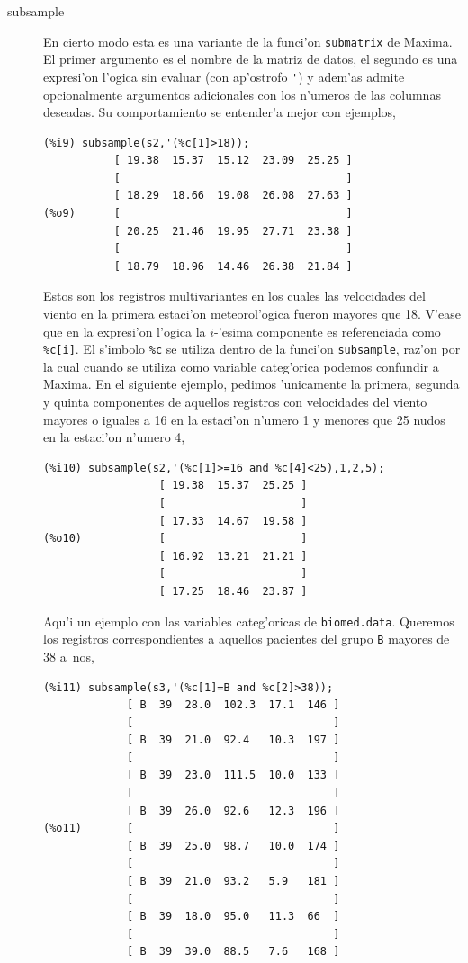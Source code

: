 \documentclass[spanish,12pt,a4paper]{article}
\begin{document}
\begin{description}
\item[subsample] En cierto modo esta es una variante de la funci'on \verb|submatrix| de Maxima. El primer argumento es el nombre de la matriz de datos, el segundo es una expresi'on l'ogica sin evaluar (con ap'ostrofo \verb|'|) y adem'as admite opcionalmente argumentos adicionales con los n'umeros de las columnas deseadas. Su comportamiento se entender'a mejor con ejemplos,
\begin{verbatim}
(%i9) subsample(s2,'(%c[1]>18));
           [ 19.38  15.37  15.12  23.09  25.25 ]
           [                                   ]
           [ 18.29  18.66  19.08  26.08  27.63 ]
(%o9)      [                                   ]
           [ 20.25  21.46  19.95  27.71  23.38 ]
           [                                   ]
           [ 18.79  18.96  14.46  26.38  21.84 ]
\end{verbatim}
Estos son los registros multivariantes en los cuales las velocidades del viento en la primera estaci'on meteorol'ogica fueron mayores que 18. V'ease que en la expresi'on l'ogica la $i$-'esima componente es referenciada como \verb|%c[i]|. El s'imbolo \verb|%c| se utiliza dentro de la funci'on \verb|subsample|, raz'on por la cual cuando se utiliza como variable categ'orica podemos confundir a Maxima. En el siguiente ejemplo, pedimos 'unicamente la primera, segunda y quinta componentes de aquellos registros con velocidades del viento mayores o iguales a 16 en la estaci'on n'umero 1 y menores que 25 nudos en la estaci'on n'umero 4,
\begin{verbatim}
(%i10) subsample(s2,'(%c[1]>=16 and %c[4]<25),1,2,5);
                  [ 19.38  15.37  25.25 ]
                  [                     ]
                  [ 17.33  14.67  19.58 ]
(%o10)            [                     ]
                  [ 16.92  13.21  21.21 ]
                  [                     ]
                  [ 17.25  18.46  23.87 ]
\end{verbatim}

Aqu'i un ejemplo con las variables categ'oricas de \verb|biomed.data|. Queremos los registros correspondientes a aquellos pacientes del grupo \verb|B| mayores de 38 a~nos,
\begin{verbatim}
(%i11) subsample(s3,'(%c[1]=B and %c[2]>38));
             [ B  39  28.0  102.3  17.1  146 ]
             [                               ]
             [ B  39  21.0  92.4   10.3  197 ]
             [                               ]
             [ B  39  23.0  111.5  10.0  133 ]
             [                               ]
             [ B  39  26.0  92.6   12.3  196 ]
(%o11)       [                               ]
             [ B  39  25.0  98.7   10.0  174 ]
             [                               ]
             [ B  39  21.0  93.2   5.9   181 ]
             [                               ]
             [ B  39  18.0  95.0   11.3  66  ]
             [                               ]
             [ B  39  39.0  88.5   7.6   168 ]
\end{verbatim}


\end{description}
\end{document}
